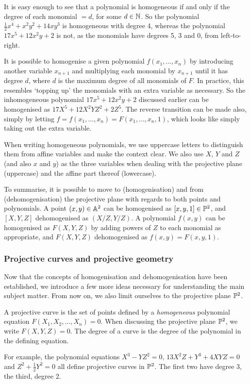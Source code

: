 It is easy enough to see that a polynomial is homogeneous if and only if the degree of each monomial $= d$, for some $d \in \N$.
So the polynomial $\frac{1}{2}x^4 + x^2y^2 + 14xy^3$ is homogeneous with degree 4, whereas the polynomial $17x^5 + 12x^2y + 2$ is not, as the monomials have degrees 5, 3 and 0, from left-to-right.

It is possible to homogenise a given polynomial $f(x_1,\ldots,x_n)$ by introducing another variable $x_{n+1}$ and multiplying each monomial by $x_{n+1}$ until it has degree $d$, where $d$ is the maximum degree of all monomials of $F$.
In practice, this resembles `topping up' the monomials with an extra variable as necessary.
So the inhomogeneous polynomial $17x^5 + 12x^2y + 2$ discussed earlier can be homogenised as $17X^5 + 12X^2YZ^2 + 2Z^5$.
The reverse transition can be made also, simply by letting $f = f(x_1,\ldots,x_n) = F(x_1,\ldots,x_n,1)$, which looks like simply taking out the extra variable.

When writing homogeneous polynomials, we use uppercase letters to distinguish them from affine variables and make the context clear.
We also use $X$, $Y$ and $Z$ (and also $x$ and $y$) as the three variables when dealing with the projective plane (uppercase) and the affine part thereof (lowercase).

To summarise, it is possible to move to (homogenisation) and from (dehomogenisation) the projective plane with regards to both points and polynomials.
A point $(x,y)\in\an[2]$ can be homogenised as $[x,y,1]\in\pn[2]$, and $[X,Y,Z]$ dehomogenised as $(X/Z,Y/Z)$.
A polynomial $f(x,y)$ can be homogenised as $F(X,Y,Z)$ by adding powers of $Z$ to each monomial as appropriate, and $F(X,Y,Z)$ dehomogenised as $f(x,y) = F(x,y,1)$.
\subsubsection{Projective curves and projective geometry}
Now that the concepts of homogenisation and dehomogenisation have been established, we introduce a few more ideas necessary for understanding the main subject matter.
From now on, we also limit ourselves to the projective plane $\pn[2]$.

\begin{definition}
	A projective curve is the set of points defined by a \emph{homogeneous} polynomial equation $F(X_1,X_2,\ldots,X_n) = 0$.
	When discussing the projective plane $\pn[2]$, we write $F(X,Y,Z) = 0$.
	The degree of a curve is the degree of the polynomial in the defining equation.
\end{definition}
For example, the polynomial equations $X^3-YZ^2=0$, $13X^2Z + Y^3 + 4XYZ = 0$ and $Z^2 + \frac{1}{2}Y^2 = 0$ all define projective curves in $\pn[2]$.
The first two have degree 3, the third, degree 2.

